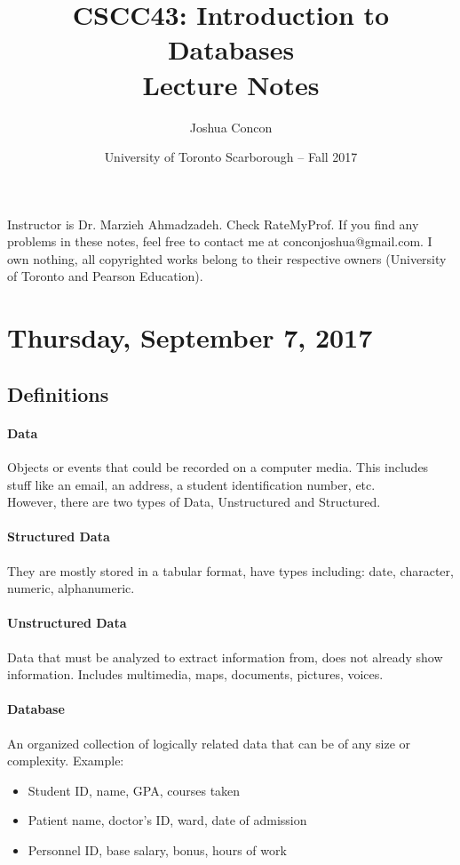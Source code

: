 \documentclass[12pt]{article}
\begin{document}
\title{CSCC43: Introduction to Databases\\ Lecture Notes}
\date{University of Toronto Scarborough -- Fall 2017}
\author{Joshua Concon}
\maketitle

Instructor is Dr. Marzieh Ahmadzadeh. Check RateMyProf. If you find any problems in these notes, feel free to contact me at conconjoshua@gmail.com. I own nothing, all copyrighted works belong to their respective owners (University of Toronto and Pearson Education).

\tableofcontents

\pagebreak

\section{Thursday, September 7, 2017}

\subsection{Definitions}

\paragraph{Data} Objects or events that could be recorded on a computer media. This includes stuff like an email, an address, a student identification number, etc.\\

However, there are two types of Data, Unstructured and Structured.

\paragraph{Structured Data} They are mostly stored in a tabular format, have types including: date, character, numeric, alphanumeric.

\paragraph{Unstructured Data} Data that must be analyzed to extract information from, does not already show information. Includes multimedia, maps, documents, pictures, voices.

\paragraph{Database} An organized collection of logically related data that can be of any size or complexity. Example:
\begin{itemize}
	\item{Student ID, name, GPA, courses taken}
	\item{Patient name, doctor's ID, ward, date of admission}
	\item{Personnel ID, base salary, bonus, hours of work}
\end{itemize}
\end{document}
